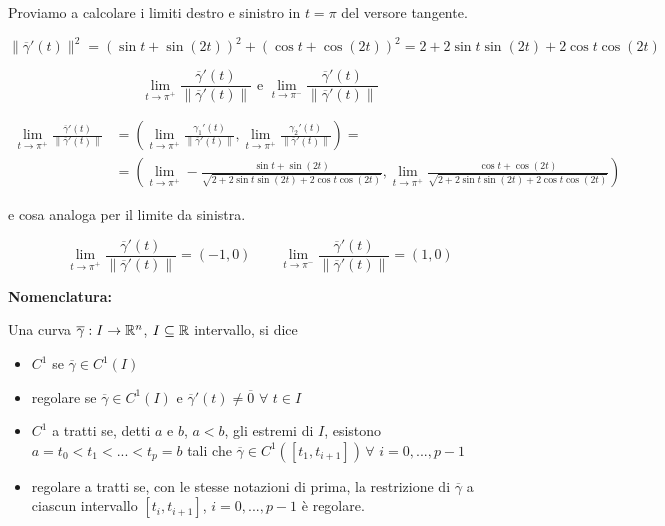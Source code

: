 \begin{exbar}
\begin{example}
	Proviamo a calcolare i limiti destro e sinistro in $t=\pi$ del versore tangente.
	
	$$\|\overline{\gamma}'(t)\|^2=(\sin t + \sin (2t))^2+(\cos t +\cos (2t))^2=2+2\sin t \sin (2t)+2\cos t \cos (2t)$$
	
	$$\lim_{t \rightarrow \pi^+}\frac{\overline{\gamma}'(t)}{\|\overline{\gamma}'(t)\|} \text{ e } \lim_{t \rightarrow \pi^-}\frac{\overline{\gamma}'(t)}{\|\overline{\gamma}'(t)\|}$$
	
	\begin{align*} 
		\lim_{t \rightarrow \pi^+} \frac{\overline{\gamma}'(t)}{\|\overline{\gamma}'(t)\|}
		&=\left( \lim_{t\rightarrow \pi^+} \frac{\gamma_1'(t)}{\| \overline{\gamma}'(t)\|},\lim_{t\rightarrow \pi^+} \frac{\gamma_2'(t)}{\| \overline{\gamma}'(t) \|} \right)=
		\\
		&=\left( \lim_{t \rightarrow \pi^+} -\frac{\sin t +\sin(2t)}{\sqrt{2+2\sin t \sin(2t)+2\cos t \cos(2t)}}, \lim_{t \rightarrow \pi^+} \frac{\cos t + \cos (2t)}{\sqrt{2+2\sin t \sin(2t)+2\cos t \cos(2t)}}\right)
	\end{align*}
	
	e cosa analoga per il limite da sinistra.
	
	$$\lim_{t \rightarrow \pi^+}\frac{\overline{\gamma}'(t)}{\|\overline{\gamma}'(t)\|}=(-1,0) \qquad \lim_{t \rightarrow \pi^-}\frac{\overline{\gamma}'(t)}{\|\overline{\gamma}'(t)\|}=(1,0)$$
\end{example}
\end{exbar}


\begin{attbar}
	\textbf{Nomenclatura:}
	
	Una curva $\overline{\gamma}: I \rightarrow \mathbb{R}^n$, $I \subseteq \mathbb{R}$ intervallo, si dice
	\begin{itemize}
		\item $C^1$ se $\overline{\gamma} \in C^1(I)$
		\item regolare se $\overline{\gamma} \in C^1(I)$ e $\overline{\gamma}'(t)\neq \overline{0} \,\, \forall \,\, t \in I$
		\item $C^1$ a tratti se, detti $a$ e $b$, $a < b$, gli estremi di $I$, esistono $a=t_0 <t_1<...<t_p=b$ tali che $\overline{\gamma} \in C^1([t_1,t_{i+1}]) \,\forall\,\, i =0,..., p-1$
		\item regolare a tratti se, con le stesse notazioni di prima, la restrizione di $\overline{\gamma}$ a ciascun intervallo  $[t_i,t_{i+1}]$, $i=0,...,p-1$ è regolare.
	\end{itemize}
\end{attbar}


